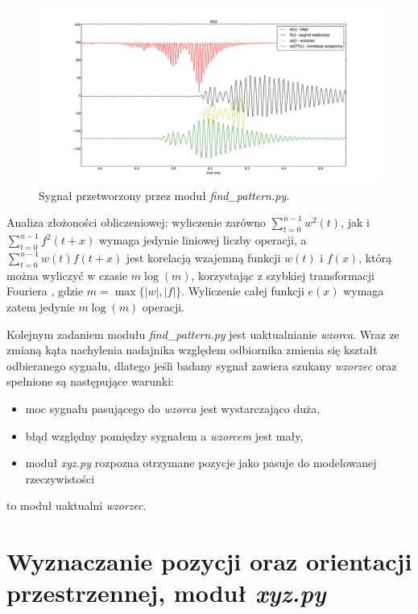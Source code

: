\begin{figure}[h!]
    \centering
    \includegraphics[width=1.15\textwidth, trim= 47mm 0mm 0mm 0mm,clip]{blad_korel}
    \caption{Sygnał przetworzony przez moduł \textit{find\_pattern.py}.}
    \label{fig:blad_korel}
\end{figure}
 
 
 Analiza złożoności obliczeniowej: wyliczenie zarówno $ \sum\limits_{t=0}^{n-1}  w^2(t) $,
jak i $\sum\limits_{t=0}^{n-1} f^2(t+x)$ wymaga jedynie liniowej liczby operacji, a 
 $\sum\limits_{t=0}^{n-1}  w(t) f(t+x) $ jest korelacją wzajemną funkcji $w(t)$ i $f(x)$, którą
 można wyliczyć w czasie $m \log(m)$, korzystając z szybkiej transformacji Fouriera \cite{bib:FFT_correlation},
 gdzie $m = \max \{|w|, |f| \}$. Wyliczenie całej funkcji $e(x)$ wymaga zatem jedynie $m \log(m)$ operacji.

 
 Kolejnym zadaniem modułu \textit{find\_pattern.py} jest uaktualnianie \textit{wzorca}.
 Wraz ze zmianą kąta nachylenia nadajnika względem odbiornika zmienia się kształt odbieranego sygnału,
 dlatego jeśli badany sygnał zawiera szukany \textit{wzorzec} oraz spełnione są następujące warunki:
 \begin{itemize}
  \item moc sygnału pasującego do \textit{wzorca} jest wystarczająco duża,
  \item błąd względny pomiędzy sygnałem a \textit{wzorcem} jest mały,
  \item moduł \textit{xyz.py} rozpozna otrzymane pozycje jako pasuje do modelowanej rzeczywistości
 \end{itemize}
to moduł uaktualni \textit{wzorzec}.
 
 
\section{Wyznaczanie pozycji oraz orientacji przestrzennej, moduł \textit{xyz.py}}

